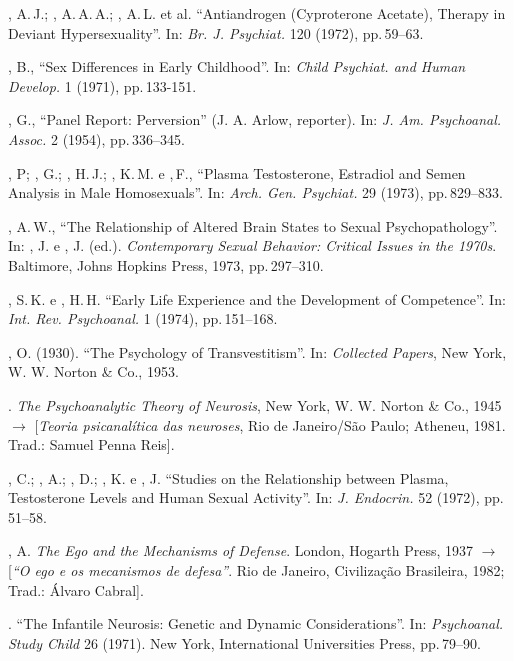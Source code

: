\begin{bibliohedra}
, A.\,J.; , A.\,A.\,A.; , A.\,L. et al.
``Antiandrogen (Cyproterone Acetate), Therapy in Deviant
Hypersexuality''. In: \textit{Br. J. Psychiat. }120 (1972), pp.\,59--63.

, B., ``Sex Differences in Early Childhood''. In: 
\textit{Child Psychiat. and Human Develop. }1 (1971), pp.\,133-151.

, G., ``Panel Report: Perversion'' (J. A.
Arlow, reporter). In: \textit{J. Am. Psychoanal. Assoc. } 2 (1954), pp.\,336--345.

, P; , G.; , H.\,J.; , K.\,M. e ,\,F.,
``Plasma Testosterone, Estradiol and Semen Analysis in Male
Homosexuals''. In: \textit{Arch. Gen. Psychiat. }29 (1973), pp.\,829--833.

, A.\,W., ``The Relationship of Altered Brain States to
Sexual Psychopathology''. In: , J. e , J. (ed.). 
\textit{Contemporary Sexual Behavior: Critical Issues in the 1970s}. Baltimore,
Johns Hopkins Press, 1973, pp.\,297--310.

, S.\,K. e , H.\,H. ``Early Life Experience and the
Development of Competence''. In: \textit{Int. Rev. Psychoanal. }1 (1974),
pp.\,151--168.

, O. (1930). ``The Psychology of
Transvestitism''. In: \textit{Collected Papers}, New York, W.
W. Norton \& Co., 1953.

. \textit{ The Psychoanalytic Theory of Neurosis}, New York, W.
W. Norton \& Co., 1945 {$\bm{\rightarrow}$} [\textit{Teoria psicanalítica das neuroses}, Rio de
Janeiro/São Paulo; Atheneu, 1981. Trad.: Samuel Penna Reis].

, C.; , A.; , D.; , K. e , J.
``Studies on the Relationship between Plasma, Testosterone Levels and
Human Sexual Activity''. In: \textit{J. Endocrin.} 52 (1972), pp.\,51--58.

, A. \textit{The Ego and the Mechanisms of Defense}. London, Hogarth
Press, 1937 {$\bm{\rightarrow}$} [\textit{``O ego e os mecanismos de
defesa''}. Rio de Janeiro, Civilização Brasileira, 1982; Trad.:
Álvaro Cabral].

. ``The Infantile Neurosis: Genetic and Dynamic
Considerations''. In: \textit{Psychoanal. Study Child }26 (1971). 
New York, International Universities Press, pp.\,79--90.


\end{bibliohedra}
